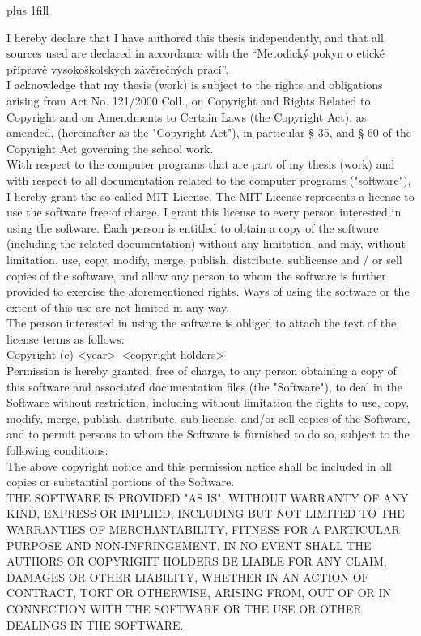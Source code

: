 \openright
\hypersetup{pageanchor=true}
\pagestyle{plain}
\vglue 0pt plus 1fill


\noindent

\medskip\noindent
I hereby declare that I have authored this thesis independently, and that all sources used are declared in accordance with the “Metodický pokyn o etické přípravě vysokoškolských závěrečných prací”. \\

I acknowledge that my thesis (work) is subject to the rights and obligations arising from Act No. 121/2000 Coll., on Copyright and Rights Related to Copyright and on Amendments to Certain Laws (the Copyright Act), as amended, (hereinafter as the "Copyright Act"), in particular § 35, and § 60 of the Copyright Act governing the school work. \\

With respect to the computer programs that are part of my thesis (work) and with respect to all documentation related to the computer programs ("software"), I hereby grant the so-called MIT License. 
The MIT License represents a license to use the software free of charge. I grant this license to every person interested in using the software. Each person is entitled to obtain a copy of the software (including the related documentation) without any limitation, and may, without limitation, use, copy, modify, merge, publish, distribute, sublicense and / or sell copies of the software, and allow any person to whom the software is further provided to exercise the aforementioned rights. Ways of using the software or the extent of this use are not limited in any way. \\ 

The person interested in using the software is obliged to attach the text of the license terms as follows: \\

Copyright (c) \textless year\textgreater \  \textless copyright holders\textgreater \\
Permission is hereby granted, free of charge, to any person
obtaining a copy of this software and associated documentation
files (the "Software"), to deal in the Software without
restriction, including without limitation the rights to use,
copy, modify, merge, publish, distribute, sub-license, and/or sell
copies of the Software, and to permit persons to whom the
Software is furnished to do so, subject to the following
conditions: \\
The above copyright notice and this permission notice shall be
included in all copies or substantial portions of the Software. \\
THE SOFTWARE IS PROVIDED "AS IS", WITHOUT WARRANTY OF ANY KIND,
EXPRESS OR IMPLIED, INCLUDING BUT NOT LIMITED TO THE WARRANTIES
OF MERCHANTABILITY, FITNESS FOR A PARTICULAR PURPOSE AND
NON-INFRINGEMENT. IN NO EVENT SHALL THE AUTHORS OR COPYRIGHT
HOLDERS BE LIABLE FOR ANY CLAIM, DAMAGES OR OTHER LIABILITY,
WHETHER IN AN ACTION OF CONTRACT, TORT OR OTHERWISE, ARISING
FROM, OUT OF OR IN CONNECTION WITH THE SOFTWARE OR THE USE OR
OTHER DEALINGS IN THE SOFTWARE. \\

